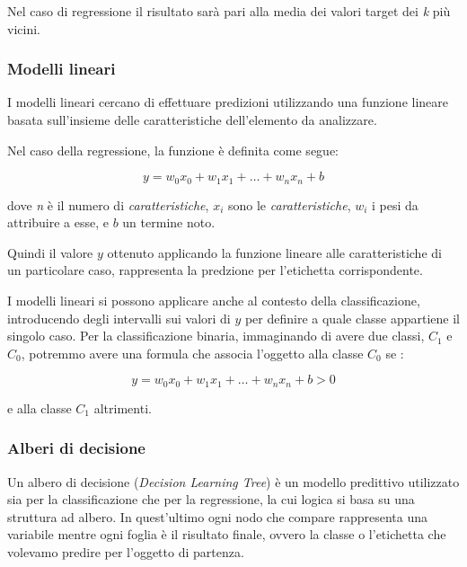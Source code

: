\documentclass[a4paper,12pt]{report}
\begin{document}
Nel caso di regressione il risultato sarà pari alla media dei valori target dei \textit{k} più vicini.

\newpage

\subsubsection{Modelli lineari}
I modelli lineari cercano di effettuare predizioni utilizzando una funzione lineare basata sull'insieme delle caratteristiche dell'elemento da analizzare.

Nel caso della regressione, la funzione è definita come segue: 

\begin{equation*}
    y  = w_0x_0 + w_1x_1 + \dots + w_nx_n + b
\end{equation*}

\noindent dove \textit{n} è il numero di \textit{caratteristiche}, $x_i$ sono le \textit{caratteristiche}, $w_i$ i pesi da attribuire a esse, e $b$ un termine noto.

Quindi il valore $y$ ottenuto applicando la funzione lineare alle caratteristiche di un particolare caso, rappresenta la predzione per l'etichetta corrispondente.

\bigskip

I modelli lineari si possono applicare anche al contesto della classificazione, introducendo degli intervalli sui valori di $y$ per definire a quale classe appartiene il singolo caso. 
Per la classificazione binaria, immaginando di avere due classi, $C_1$ e $C_0$, potremmo avere una formula che associa l'oggetto alla classe $C_0$ se :

\begin{equation*}
    y = w_0x_0 + w_1x_1 + \dots + w_nx_n + b > 0
\end{equation*}

\noindent e alla classe $C_1$ altrimenti.


\subsubsection{Alberi di decisione}

Un albero di decisione (\textit{Decision Learning Tree}) è un modello predittivo utilizzato sia per la classificazione che per la regressione, la cui logica si basa su una struttura ad albero. In quest'ultimo ogni nodo che compare rappresenta una variabile mentre ogni foglia è il risultato finale, ovvero la classe o l'etichetta che volevamo predire per l'oggetto di partenza.
\end{document}
